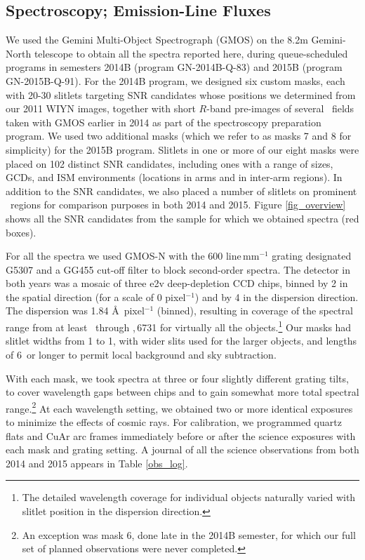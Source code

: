 \subsection{Spectroscopy; Emission-Line Fluxes}


We used the Gemini Multi-Object Spectrograph (GMOS) on the 8.2m Gemini-North telescope to obtain all the spectra reported here, during queue-scheduled programs in semesters 2014B (program GN-2014B-Q-83) and 2015B (program GN-2015B-Q-91).  
For the 2014B program, we designed six custom masks, each with 20-30 slitlets targeting SNR candidates whose positions we determined from our 2011 WIYN images, together with  short $R$-band pre-images of several \gal\ fields taken with GMOS earlier in 2014 as part of the spectroscopy preparation program.    
We used two additional masks (which we refer to as masks 7 and 8 for simplicity)  for the 2015B program.  Slitlets in one or more of our eight masks were placed on 102 distinct SNR candidates, including ones with a range of sizes, GCDs, and ISM environments (locations in arms and in 
inter-arm regions).  In addition to the SNR candidates, we also placed a number of slitlets on prominent \hii\ regions for comparison purposes in both 2014 and 2015.
Figure \ref{fig_overview} shows all the SNR candidates from the sample for which we obtained spectra (red boxes). 

For all the spectra we used GMOS-N with the 600 line\,mm$^{-1}$ grating designated G5307 and a GG455 cut-off filter to block second-order spectra.   The detector in both years was a mosaic of three e2v deep-depletion CCD chips, binned by 2 in the spatial direction (for a scale of 0 pixel$^{-1}$) and by 4 in the dispersion direction.  
The dispersion was 1.84 \AA\,  pixel$^{-1}$ (binned), resulting in coverage of the spectral range from at least \hb\ through \sii{},\,6731 for virtually all the objects.\footnote{The detailed wavelength coverage for individual objects naturally varied with slitlet position in the dispersion direction.}  Our  masks had  slitlet  widths from 1 to 1, with wider slits used for the larger objects, and lengths of 6\arcsec\ or longer to permit local background and sky subtraction.   

With each mask, we took spectra at three or four slightly different grating tilts, to cover wavelength gaps between chips and to gain somewhat more total spectral range.\footnote{An exception was mask 6, done late in the 2014B semester, for which our full set of planned observations were never completed.}  At each wavelength setting, we obtained two or more identical exposures to minimize the effects of cosmic rays.
For calibration, we programmed quartz flats and CuAr arc frames immediately before or after the science exposures with each mask and grating setting.  A journal of all the science observations from both 2014 and 2015 appears in Table \ref{obs_log}.  

